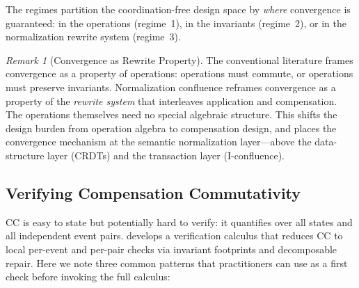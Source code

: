 \documentclass[11pt,a4paper]{article}
\theoremstyle{plain}
\theoremstyle{definition}
\theoremstyle{remark}
\newtheorem{remark}[theorem]{Remark}
\begin{document}
The regimes partition the coordination-free design space by \emph{where}
convergence is guaranteed: in the operations (regime~1), in the invariants
(regime~2), or in the normalization rewrite system (regime~3).

\begin{remark}[Convergence as Rewrite Property]
\label{rem:rewrite-property}
The conventional literature frames convergence as a property of operations:
operations must commute, or operations must preserve invariants.
Normalization confluence reframes convergence as a property of the
\emph{rewrite system} that interleaves application and compensation.  The
operations themselves need no special algebraic structure.  This shifts the
design burden from operation algebra to compensation design, and places the
convergence mechanism at the semantic normalization layer---above the
data-structure layer (CRDTs) and the transaction layer (I-confluence).
\end{remark}

\subsection{Verifying Compensation Commutativity}
\label{sec:verify-cc}

CC is easy to state but potentially hard to verify: it quantifies over all
states and all independent event pairs.   develops a
verification calculus that reduces CC to local per-event and per-pair checks
via invariant footprints and decomposable repair.  Here we note three common
patterns that practitioners can use as a first check before invoking the full
calculus:
\end{document}
